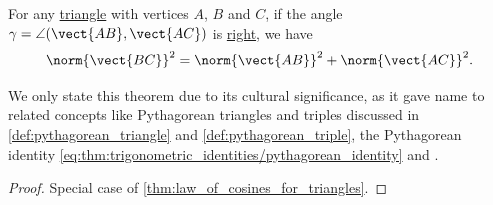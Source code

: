 \begin{theorem}\label{thm:pythagorean_theorem}
  For any \hyperref[def:triangle]{triangle} with vertices \( A \), \( B \) and \( C \), if the angle \( \gamma = \angle(\vect{AB}, \vect{AC}) \) is \hyperref[def:angle/measure/right]{right}, we have
  \begin{equation}\label{eq:thm:pythagorean_theorem}
    \norm{\vect{BC}}^2 = \norm{\vect{AB}}^2 + \norm{\vect{AC}}^2.
  \end{equation}
\end{theorem}
\begin{comments}
  \item We only state this theorem due to its cultural significance, as it gave name to related concepts like Pythagorean triangles and triples discussed in \cref{def:pythagorean_triangle} and \cref{def:pythagorean_triple}, the Pythagorean identity \eqref{eq:thm:trigonometric_identities/pythagorean_identity} and .
\end{comments}
\begin{proof}
  Special case of \cref{thm:law_of_cosines_for_triangles}.
\end{proof}

